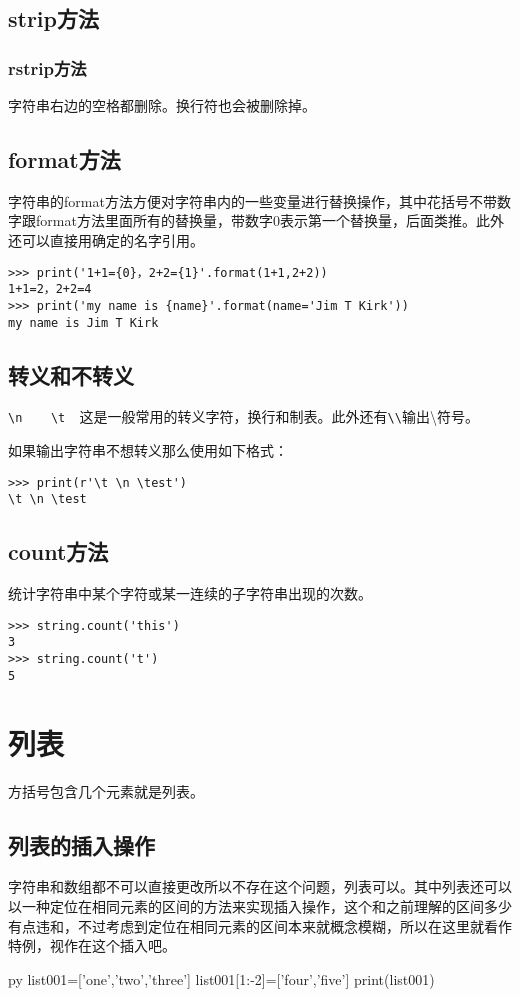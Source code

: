 \documentclass[12pt,oneside]{book}
\begin{document}
\begin{common-format}
\subsection{strip方法}

\subsubsection{rstrip方法}
字符串右边的空格都删除。换行符也会被删除掉。

\subsection{format方法}
字符串的format方法方便对字符串内的一些变量进行替换操作，其中花括号不带数字跟format方法里面所有的替换量，带数字0表示第一个替换量，后面类推。此外还可以直接用确定的名字引用。
\begin{Verbatim}
>>> print('1+1={0}，2+2={1}'.format(1+1,2+2))
1+1=2，2+2=4
>>> print('my name is {name}'.format(name='Jim T Kirk'))
my name is Jim T Kirk
\end{Verbatim}

\subsection{转义和不转义}
\verb+\n    \t  +这是一般常用的转义字符，换行和制表。此外还有\verb+\\+输出\textbackslash 符号。

如果输出字符串不想转义那么使用如下格式：
\begin{Verbatim}
>>> print(r'\t \n \test')
\t \n \test
\end{Verbatim}

\subsection{count方法}
统计字符串中某个字符或某一连续的子字符串出现的次数。
\begin{Verbatim}
>>> string.count('this')
3
>>> string.count('t')
5
\end{Verbatim}






\section{列表}
方括号包含几个元素就是列表。


\subsection{列表的插入操作}
\label{sec:列表插入操作}
字符串和数组都不可以直接更改所以不存在这个问题，列表可以。其中列表还可以以一种定位在相同元素的区间的方法来实现插入操作，这个和之前理解的区间多少有点违和，不过考虑到定位在相同元素的区间本来就概念模糊，所以在这里就看作特例，视作在这个插入吧。
\begin{xverbatim}[129]{py}
list001=['one','two','three']
list001[1:-2]=['four','five']
print(list001)
\end{xverbatim}


\end{common-format}
\end{document}
